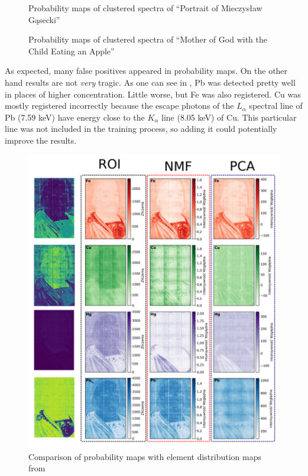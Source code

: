 \begin{figure}[H]
  \centering
  
  \caption{Probability maps of clustered spectra of ``Portrait of Mieczysław Gąsecki''}
  \label{fig:clusters-prob-gasecki}
\end{figure}

\begin{figure}[H]
  \centering
  
  \caption{Probability maps of clustered spectra of ``Mother of
God with the Child Eating an Apple''}
  \label{fig:clusters-prob-matka-boska}
\end{figure}

As expected, many false positives appeared in probability maps.
On the other hand results are not \emph{very} tragic. 
As one can see in , Pb was detected pretty well in places of higher concentration.
Little worse, but Fe was also registered.
Cu was mostly registered incorrectly because the escape photons of the $L_{\alpha}$ spectral line of Pb (7.59 keV) have energy close to the $K_{\alpha}$ line (8.05 keV) of Cu. 
This particular line was not included in the training process, so adding it could potentially improve the results.

\begin{figure}[htbp!]
  \centering
  \includegraphics[width=1\textwidth]{img/comparison-lach.png}
  \caption{Comparison of probability maps with element distribution maps from \cite{Lach2022}}
  \label{fig:lach-comparison}
\end{figure}

